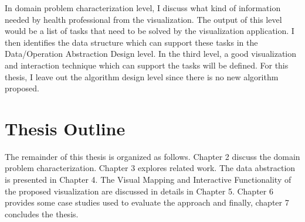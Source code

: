In domain problem characterization level, I discuss what kind of information needed by health professional from the visualization. The output of this level would be a list of tasks that need to be solved by the visualization application. I then identifies the data structure which can support these tasks in the Data/Operation Abstraction Design level. In the third level, a good visualization and interaction technique which can support the tasks will be defined. For this thesis, I leave out the algorithm design level since there is no new algorithm proposed.

\section{Thesis Outline}

The remainder of this thesis is organized as follows. Chapter 2 discuss the domain problem characterization. Chapter 3 explores related work. The data abstraction is presented in Chapter 4. The Visual Mapping and Interactive Functionality of the proposed visualization are discussed in details in Chapter 5. Chapter 6 provides some case studies used to evaluate the approach and finally, chapter 7 concludes the thesis.
